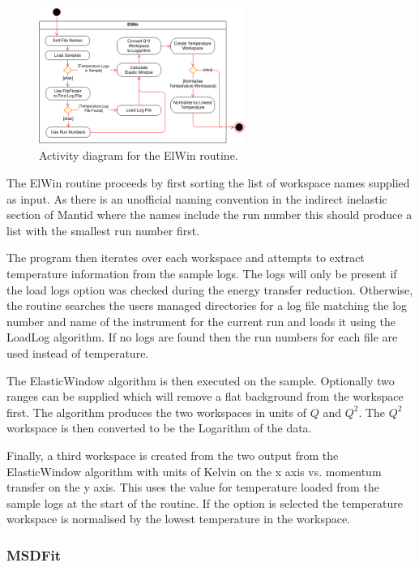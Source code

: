 \documentclass[paper=a4, fontsize=11pt]{scrartcl}	%
\numberwithin{equation}{section}															%
\numberwithin{figure}{section}																%
\numberwithin{table}{section}																%
\begin{document}
\begin{figure}[H]
\centering
\includegraphics[width=0.6\textwidth]{img/uml/activity_diagrams/ElWin_activity.png}
\caption{Activity diagram for the ElWin routine.}
\label{fig:elwin-acticity-diagram}
\end{figure}

The ElWin routine proceeds by first sorting the list of workspace names supplied as input. As there is an unofficial naming convention in the indirect inelastic section of Mantid where the names include the run number this should produce a list with the smallest run number first.

The program then iterates over each workspace and attempts to extract temperature information from the sample logs. The logs will only be present if the load logs option was checked during the energy transfer reduction. Otherwise, the routine searches the users managed directories for a log file matching the log number and name of the instrument for the current run and loads it using the LoadLog algorithm. If no logs are found then the run numbers for each file are used instead of temperature.

The ElasticWindow algorithm is then executed on the sample. Optionally two ranges can be supplied which will remove a flat background from the workspace first. The algorithm produces the two workspaces in units of $Q$ and $Q^2$. The $Q^2$ workspace is then converted to be the Logarithm of the data.

Finally, a third workspace is created from the two output from the ElasticWindow algorithm with units of Kelvin on the x axis vs. momentum transfer on the y axis. This uses the value for temperature loaded from the sample logs at the start of the routine. If the option is selected the temperature workspace is normalised by the lowest temperature in the workspace.

\subsubsection{MSDFit}
\label{subsubsec:msdfit}
\end{document}
